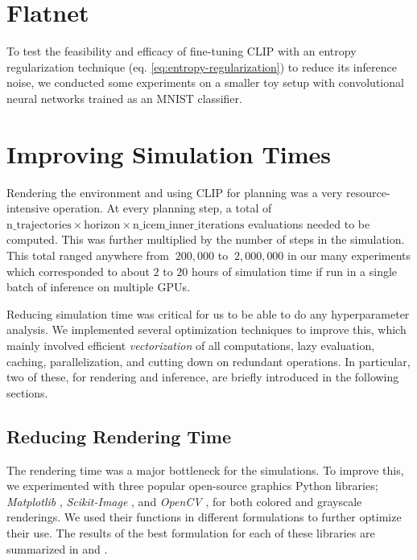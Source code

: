 \chapter{Flatnet}
\label{sec:flatnet}
To test the feasibility and efficacy of fine-tuning CLIP with an entropy regularization technique (eq. \ref{eq:entropy-regularization}) to reduce its inference noise, we conducted some experiments on a smaller toy setup with convolutional neural networks trained as an MNIST classifier.




\chapter{Improving Simulation Times}
\label{sec:efficiency}
Rendering the environment and using CLIP for planning was a very resource-intensive operation.
At every planning step, a total of \(\text{n\_trajectories} \times \text{horizon} \times \text{n\_icem\_inner\_iterations}\) evaluations needed to be computed.
This was further multiplied by the number of steps in the simulation.
This total ranged anywhere from \(~200,000\) to \(~2,000,000\) in our many experiments which corresponded to about \(2\) to \(20\) hours of simulation time if run in a single batch of inference on multiple GPUs.

Reducing simulation time was critical for us to be able to do any hyperparameter analysis.
We implemented several optimization techniques to improve this, which mainly involved efficient \emph{vectorization} of all computations, lazy evaluation, caching, parallelization, and cutting down on redundant operations.
In particular, two of these, for rendering and inference, are briefly introduced in the following sections.

\section{Reducing Rendering Time}
\label{sec:improving-render}
The rendering time was a major bottleneck for the simulations.
To improve this, we experimented with three popular open-source graphics Python libraries; \emph{Matplotlib} \citep{matplotlib}, \emph{Scikit-Image} \citep{skimage}, and \emph{OpenCV} \citep{opencv}, for both colored and grayscale renderings.
We used their functions in different formulations to further optimize their use.
The results of the best formulation for each of these libraries are summarized in  and .\\


